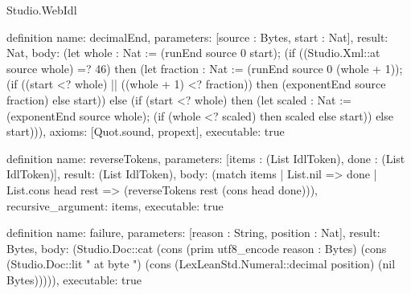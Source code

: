 \begin{lexlean}{Studio.WebIdl}
\begin{semanticmodule}
definition{
  name: decimalEnd,
  parameters: [source : Bytes, start : Nat],
  result: Nat,
  body: (let whole : Nat := (runEnd source 0 start); (if ((Studio.Xml::at source whole) =? 46) then (let fraction : Nat := (runEnd source 0 (whole + 1)); (if ((start <? whole) || ((whole + 1) <? fraction)) then (exponentEnd source fraction) else start)) else (if (start <? whole) then (let scaled : Nat := (exponentEnd source whole); (if (whole <? scaled) then scaled else start)) else start))),
  axioms: [Quot.sound, propext],
  executable: true
}

definition{
  name: reverseTokens,
  parameters: [items : (List IdlToken), done : (List IdlToken)],
  result: (List IdlToken),
  body: (match items
    | List.nil => done
    | List.cons head rest => (reverseTokens rest (cons head done))),
  recursive_argument: items,
  executable: true
}

definition{
  name: failure,
  parameters: [reason : String, position : Nat],
  result: Bytes,
  body: (Studio.Doc::cat (cons (prim utf8_encode reason : Bytes) (cons (Studio.Doc::lit " at byte ") (cons (LexLeanStd.Numeral::decimal position) (nil Bytes))))),
  executable: true
}


\end{semanticmodule}
\end{lexlean}
